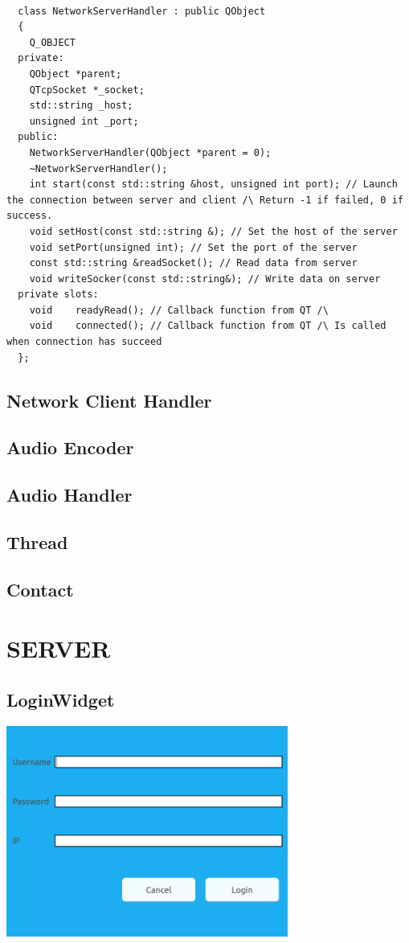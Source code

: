 \documentclass{article}
\begin{document}
\begin{lstlisting}

  class NetworkServerHandler : public QObject
  {
    Q_OBJECT
  private:
    QObject *parent;
    QTcpSocket *_socket;
    std::string _host;
    unsigned int _port;
  public:
    NetworkServerHandler(QObject *parent = 0);
    ~NetworkServerHandler();
    int start(const std::string &host, unsigned int port); // Launch the connection between server and client /\ Return -1 if failed, 0 if success.
    void setHost(const std::string &); // Set the host of the server
    void setPort(unsigned int); // Set the port of the server
    const std::string &readSocket(); // Read data from server
    void writeSocker(const std::string&); // Write data on server
  private slots:
    void	readyRead(); // Callback function from QT /\
    void	connected(); // Callback function from QT /\ Is called when connection has succeed
  };

\end{lstlisting}
\newpage
\subsection{Network Client Handler}
\subsection{Audio Encoder}
\subsection{Audio Handler}
\subsection{Thread}
\subsection{Contact}
\newpage
\section{SERVER}

\subsection{LoginWidget}
  \includegraphics[width=350]{LoginWidget}
  \newpage
\end{document}
